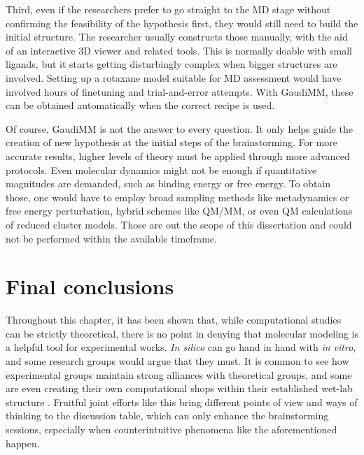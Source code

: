 Third, even if the researchers prefer to go straight to the MD stage without confirming the feasibility of the hypothesis first, they would still need to build the initial structure. The researcher usually constructs those manually, with the aid of an interactive 3D viewer and related tools. This is normally doable with small ligands, but it starts getting disturbingly complex when bigger structures are involved. Setting up a rotaxane model suitable for MD assessment would have involved hours of finetuning and trial-and-error attempts. With GaudiMM, these can be obtained automatically when the correct recipe is used.

Of course, GaudiMM is not the answer to every question. It only helps guide the creation of new hypothesis at the initial steps of the brainstorming. For more accurate results, higher levels of theory must be applied through more advanced protocols. Even molecular dynamics might not be enough if quantitative magnitudes are demanded, such as binding energy or free energy. To obtain those, one would have to employ broad sampling methods like metadynamics or free energy perturbation, hybrid schemes like QM/MM, or even QM calculations of reduced cluster models. Those are out the scope of this dissertation and could not be performed within the available timeframe.

\section{Final conclusions}
Throughout this chapter, it has been shown that, while computational studies can be strictly theoretical, there is no point in denying that molecular modeling is a helpful tool for experimental works. \textit{In silico} can go hand in hand with \textit{in vitro}, and some research groups would argue that they must. It is common to see how experimental groups maintain strong alliances with theoretical groups, and some are even creating their own computational shops within their established wet-lab structure . Fruitful joint efforts like this bring different points of view and ways of thinking to the discussion table, which can only enhance the brainstorming sessions, especially when counterintuitive phenomena like the aforementioned happen.

